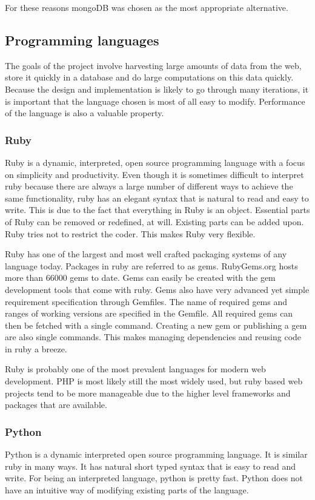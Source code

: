 For these reasons mongoDB was chosen as the most appropriate alternative.


\subsection{Programming languages}
The goals of the project involve harvesting large amounts of data from the web, store it quickly in a database and do large computations on this data quickly. Because the design and implementation is likely to go through many iterations, it is important that the language chosen is most of all easy to modify. Performance of the language is also a valuable property.

\subsubsection{Ruby}
Ruby is a dynamic, interpreted, open source programming language with a focus on simplicity and productivity. Even though it is sometimes difficult to interpret ruby because there are always a large number of different ways to achieve the same functionality, ruby has an elegant syntax that is natural to read and easy to write. This is due to the fact that everything in Ruby is an object. Essential parts of Ruby can be removed or redefined, at will. Existing parts can be added upon. Ruby tries not to restrict the coder. This makes Ruby very flexible. \cite{ruby-about}

Ruby has one of the largest and most well crafted packaging systems of any language today. Packages in ruby are referred to as gems. RubyGems.org hosts more than 66000 gems to date. Gems can easily be created with the gem development tools that come with ruby. Gems also have very advanced yet simple requirement specification through Gemfiles. The name of required gems and ranges of working versions are specified in the Gemfile. All required gems can then be fetched with a single command. Creating a new gem or publishing a gem are also single commands. This makes managing dependencies and reusing code in ruby a breeze.\cite{rubygems}

Ruby is probably one of the most prevalent languages for modern web development. PHP is most likely still the most widely used, but ruby based web projects tend to be more manageable due to the higher level frameworks and packages that are available.

\subsubsection{Python}
Python is a dynamic interpreted open source programming language. It is similar ruby in many ways. It has natural short typed syntax that is easy to read and write. For being an interpreted language, python is pretty fast. Python does not have an intuitive way of modifying existing parts of the language.\cite{python-about}

